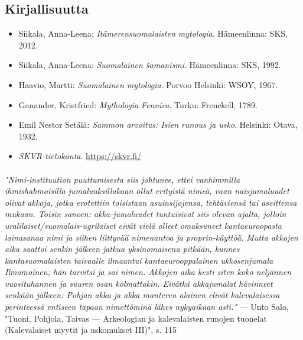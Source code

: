 \subsection{Kirjallisuutta}

  \begin{itemize}
    \item Siikala, Anna-Leena: \emph{Itämerensuomalaisten mytologia}. Hämeenlinna: SKS, 2012.
    \item Siikala, Anna-Leena: \emph{Suomalainen šamanismi}. Hämeenlinna: SKS, 1992.
    \item Haavio, Martti: \emph{Suomalainen mytologia}. Porvoo Helsinki: WSOY, 1967.
    \item Ganander, Kristfried: \emph{Mythologia Fennica}. Turku: Frenckell, 1789.
    \item Emil Nestor Setälä: \emph{Sammon arvoitus: Isien runous ja usko}. Helsinki: Otava, 1932.
    \item \emph{SKVR-tietokanta}. \url{https://skvr.fi/}
  \end{itemize}

  \paragraph{}
    {\small
      \emph{"Nimi-instituution puuttumisesta siis johtunee, ettei vanhimmilla ihmishahmoisilla
      jumaluuksillakaan ollut erityistä nimeä, vaan naisjumaluudet olivat akkoja, jotka erotettiin
      toisistaan asuinsijojensa, tehtäviensä tai aseittensa mukaan. Toisin sanoen: akka-jumaluudet
      tuntuisivat siis olevan ajalta, jolloin uralilaiset/suomalais-ugrilaiset eivät vielä olleet
      omaksuneet kantaeuroopasta lainasanaa nimi ja siihen liittyvää nimenantoa ja proprin-käyttöä.
      Mutta akkojen aika saattoi senkin jälkeen jatkua yksinomaisena pitkään, kunnes
      kantasuomalaisten taivaalle ilmaantui kantaeurooppalainen ukkosenjumala Ilmamoinen; hän
      tarvitsi ja sai nimen. Akkojen aika kesti siten koko neljännen vuosituhannen ja suuren osan
      kolmattakin. Eivätkä akkajumalat hävinneet senkään jälkeen: Pohjan akka ja akka manteren
      alainen elivät kalevalaisessa perinteessä entiseen tapaan nimettöminä lähes nykyaikaan
      asti."} --- Unto Salo, "Tuoni, Pohjola, Taivas --- Arkeologian ja kalevalaisten runojen
      tuonelat (Kalevalaiset myytit ja uskomukset III)", s. 115
    }
